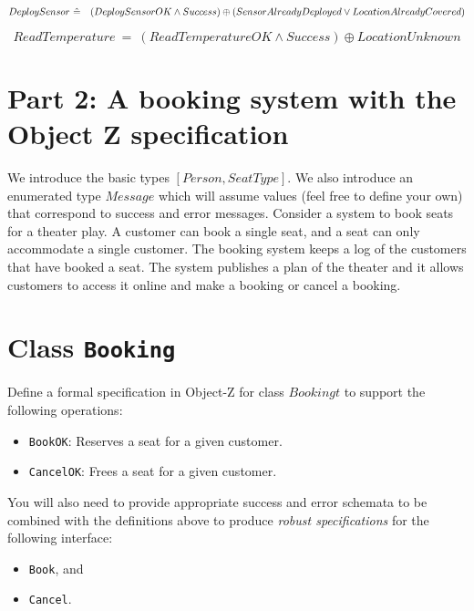 \documentclass[12pt]{article}
\begin{document}
\[ DeploySensor~\hat{=}~\\
~~~(DeploySensorOK \wedge Success) \oplus (SensorAlreadyDeployed \vee LocationAlreadyCovered) \]



\[ ReadTemperature~\hat{=}~(ReadTemperatureOK \wedge Success) \oplus LocationUnknown \]



\newpage



\section*{Part 2:  A booking system with the Object Z specification}

We introduce the basic types $[Person, SeatType]$. We also introduce an enumerated type $Message$ which will assume values (feel free to define your own) that correspond to success and error messages. Consider a system to book seats for a theater play. A customer can book a single seat, and a seat can only accommodate a single customer. The booking system keeps a log of the customers that have booked a seat. The system publishes a plan of the theater and it allows customers to access it online and make a booking or cancel a booking.\\

\section*{Class \texttt{Booking}}

Define a formal specification in Object-Z for class $Bookingt$ to  support the following operations:

\begin{itemize}

\item \texttt{BookOK}: Reserves a seat for a given customer.

\item \texttt{CancelOK}:  Frees a seat for a given customer.

\end{itemize}

\noindent You will also need to provide appropriate success and error schemata to be combined with the definitions above to produce \textit{robust specifications} for the following interface:

\begin{itemize}

\item \texttt{Book}, and

\item \texttt{Cancel}.

\end{itemize}
\end{document}
